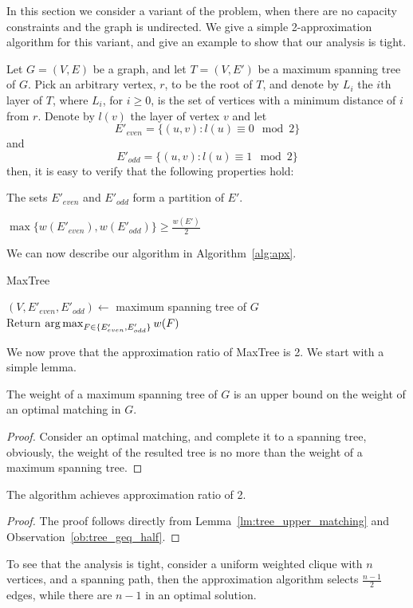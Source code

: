 \label{sub:ucudcm}
In this section we consider a variant of the problem, 
when there are no capacity constraints and the graph is undirected.
We give a simple 2-approximation algorithm for this variant, 
and give an example to show that our analysis is tight.

Let $G = (V, E)$ be a graph, 
and let $T = (V, E')$ be a maximum spanning tree of $G$.
Pick an arbitrary vertex, $r$, to be the root of $T$, 
and denote by $L_i$ the $i$th layer of $T$, 
where $L_i$, for $i \geq 0$, is the set of vertices with a minimum distance of $i$ from $r$.
Denote by $l(v)$ the layer of vertex $v$ and let 
$$ E'_{even} = \{ (u, v) : l(u) \equiv 0 \mod 2 \} $$
and    
$$ E'_{odd} = \{ (u, v) : l(u) \equiv 1 \mod 2 \} $$
then, it is easy to verify that the following properties hold:

\begin{observation}
The sets $E'_{even}$ and $E'_{odd}$ form a partition of $E'$. 
\end{observation}

\begin{observation}
\label{ob:tree_geq_half}
$ \max\{w(E'_{even}), w(E'_{odd})\}  \geq \frac{w(E')}{2} $
\end{observation}

We can now describe our algorithm in Algorithm~\ref{alg:apx}.

\begin{algorithm}
\label{alg:apx}
\caption{MaxTree}
$(V, E'_{even}, E'_{odd}) \leftarrow$ maximum spanning tree of $G$		\\
Return $\operatorname*{arg\,max}_{F \in \{ E'_{even}, E'_{odd} \}}{w(F)} $	\\
\end{algorithm}

We now prove that the approximation ratio of MaxTree is 2.
We start with a simple lemma.

\begin{lemma}
\label{lm:tree_upper_matching}
The weight of a maximum spanning tree of $G$ is an upper bound on the weight of
an optimal matching in $G$.
\end{lemma}

\begin{proof}
Consider an optimal matching, and complete it to a spanning tree, obviously, the
weight of the resulted tree is no more than the weight of a maximum spanning
tree.
\end{proof}

\begin{theorem}
The \UCUDCARPOOL{} algorithm achi\-eves approximation ratio of 2.
\end{theorem}

\begin{proof}
The proof follows directly from 
Lemma~\ref{lm:tree_upper_matching} and Observation~\ref{ob:tree_geq_half}.
\end{proof}

To see that the analysis is tight, 
consider a uniform weighted clique with $n$ vertices, 
and a spanning path, 
then the approximation algorithm selects $\frac{n - 1}{2}$ edges, 
while there are $n - 1$ in an optimal solution.  